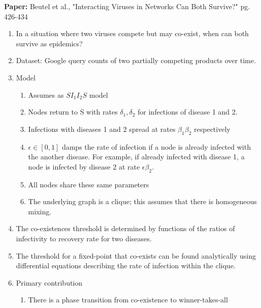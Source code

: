 \documentclass[11pt]{article}
\begin{document}
\textbf{Paper: } Beutel et al., "Interacting Viruses in Networks Can Both Survive?" pg. 426-434
\begin{enumerate}
    
    \item In a situation where two viruses compete but may co-exist, when can both survive as epidemics?
    
    \item Dataset: Google query counts of two partially competing products over time.
    
    \item Model \begin{enumerate}
        \item Assumes as $SI_{1}I_{2}S$ model
        
        \item Nodes return to S with rates $\delta_{1},\delta_{2}$ for infections of disease 1 and 2.
        
        \item Infections with diseases 1 and 2 spread at rates $\beta_{1}\beta_{2}$ respectively
        
        \item $\epsilon \in [0,1]$ damps the rate of infection if a node is already infected with the another disease. For example, if already infected with disease 1, a node is infected by disease 2 at rate $\epsilon\beta_{2}$.
        
        \item All nodes share these same parameters
        
        \item The underlying graph is a clique; this assumes 
        that there is homogeneous mixing. 
         
        
    \end{enumerate}
    
    \item The co-existences threshold is determined by functions of the ratios of infectivity to recovery rate for two diseases.
    
    
    \item The threshold for a fixed-point that co-exists can be 
    found analytically using differential equations describing the rate of infection within the clique.
    
    \item Primary contribution \begin{enumerate}
        \item There is a phase transition from co-existence to winner-takes-all
    \end{enumerate}
    
\end{enumerate}
\end{document}
